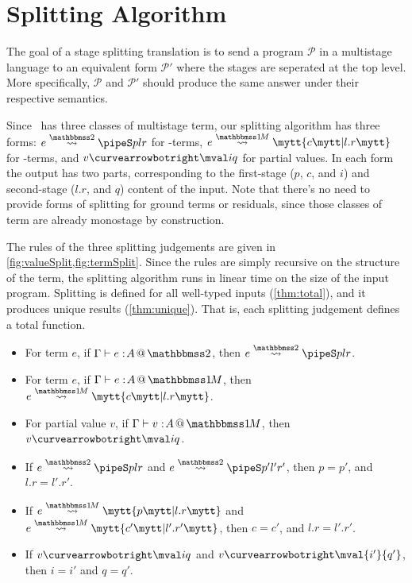 
\section{Splitting Algorithm}
\label{sec:splitting}

\begin{abstrsyn}

The goal of a stage splitting translation 
is to send a program $\mathcal P$ in a multistage language
to an equivalent form $\mathcal P'$ where the stages are seperated at the top level.
More specifically, $\mathcal P$ and $\mathcal P'$ should produce 
the same answer under their respective semantics.

Since \lang\ has three classes of multistage term, 
our splitting algorithm has three forms: 
$\splittwo e A p l r$ for \bbtwo-terms, 
$\splitone e A c {l.r}$ for \bbonem-terms, and 
\mbox{$v \vsplito \mval i q$} for partial values.
In each form the output has two parts, corresponding to the
first-stage ($p$, $c$, and $i$) and second-stage ($l.r$, and $q$) content of the input.
Note that there's no need to provide forms of splitting for ground terms or residuals,
since those classes of term are already monostage by construction.

The rules of the three splitting judgements are given in \ref{fig:valueSplit,fig:termSplit}.
Since the rules are simply recursive on the structure of the term, 
the splitting algorithm runs in linear time on the size of the input program.
Splitting is defined for all well-typed inputs (\ref{thm:total}), and it produces unique results (\ref{thm:unique}).
That is, each splitting judgement defines a total function.

\begin{theorem}  \leavevmode
\label{thm:total} 
\vspace{-0.75em}
\begin{itemize} 
\item For term $e$, if $\typestwo e A$, then $\splittwo e A p l r$. 
\item For term $e$, if $\typesone e A$, then $\splitone e A c {l.r}$.
\item For partial value $v$, if $\typesone v A$, then $v \vsplito \mval i q$.
\end{itemize}
\end{theorem}

\begin{theorem}  \leavevmode
\label{thm:unique}
\vspace{-0.75em}
\begin{itemize} 
\item If $\splittwo e A p l r$ and $\splittwo e A {p'} {l'} {r'}$, then $p = p'$, and $l.r = l'.r'$.
\item If $\splitone e A p {l.r}$ and $\splitone e A {c'} {l'.r'}$, then $c = c'$, and $l.r = l'.r'$.
\item If $v \vsplito \mval i q$ and $v \vsplito \mval {i'} {q'}$, then $i = i'$ and $q = q'$.
\end{itemize}
\end{theorem}


\end{abstrsyn}
